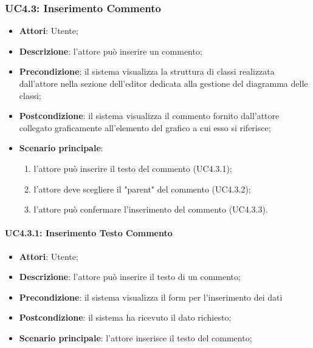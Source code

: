 \subsubsection{UC4.3: Inserimento Commento}
\label{UC4.3}
\begin{itemize}
\item \textbf{Attori}: Utente;
\item \textbf{Descrizione}: l'attore può inserire un commento;
\item \textbf{Precondizione}: il sistema visualizza la struttura di classi realizzata dall'attore nella sezione dell'editor dedicata alla gestione del diagramma delle classi;
\item \textbf{Postcondizione}: il sistema visualizza il commento fornito dall'attore collegato graficamente all'elemento del grafico a cui esso si riferisce;	
\item \textbf{Scenario principale}:
\begin{enumerate}
\item l'attore può inserire il testo del commento (UC4.3.1);
\item l'attore deve scegliere il "parent" del commento (UC4.3.2);
\item l'attore può confermare l'inserimento del commento (UC4.3.3).
\end{enumerate}
\end{itemize}

\paragraph{UC4.3.1: Inserimento Testo Commento}
\label{UC4.3.1}
\begin{itemize}
\item \textbf{Attori}: Utente;
\item \textbf{Descrizione}: l'attore può inserire il testo di un commento;
\item \textbf{Precondizione}: il sistema visualizza il form per l'inserimento dei dati	
\item \textbf{Postcondizione}: il sistema ha ricevuto il dato richiesto;	
\item \textbf{Scenario principale}:
l'attore inserisce il testo del commento;
\end{itemize}

